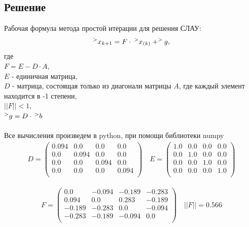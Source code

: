 \documentclass[letterpaper, 11pt]{extarticle}
\begin{document}
\subsection*{Решение}

Рабочая формула метода простой итерации для решения СЛАУ:
\begin{equation}
    ^>x_{k+1} = F \cdot \hspace*{0.2em} ^>x_{(k)} + ^>g,
\end{equation}
где\\
$F = E - D \cdot A$, \\
$E $ - единичная матрица,\\
$D $ - матрица, состоящая только из диагонали матрицы $A$, 
где каждый элемент находится в -1 степени,\\
$||F|| < 1$,\\
$^>g = D \cdot \hspace*{0.2em} ^>b$\\\\

\noindent Все вычисления произведем в python, при помощи библиотеки numpy
\begin{align*}
    D = \begin{pmatrix}
        0.094 & 0.0 & 0.0 & 0.0 \\
        0.0 & 0.094 & 0.0 & 0.0 \\
        0.0 & 0.0 & 0.094 & 0.0 \\
        0.0 & 0.0 & 0.0 & 0.094 \\
    \end{pmatrix}
    \quad
    E = \begin{pmatrix}
        1.0 & 0.0 & 0.0 & 0.0 \\
        0.0 & 1.0 & 0.0 & 0.0 \\
        0.0 & 0.0 & 1.0 & 0.0 \\
        0.0 & 0.0 & 0.0 & 1.0 \\
    \end{pmatrix}
\end{align*}

\begin{align*}
    F = \begin{pmatrix}
        0.0 & -0.094 & -0.189 & -0.283 \\
        0.094 & 0.0 & 0.283 & -0.189 \\
        -0.189 & -0.283 & 0.0 & -0.094 \\
        -0.283 & -0.189 & -0.094 & 0.0 \\
    \end{pmatrix}
    \quad
    ||F|| = 0.566
\end{align*}
\end{document}

